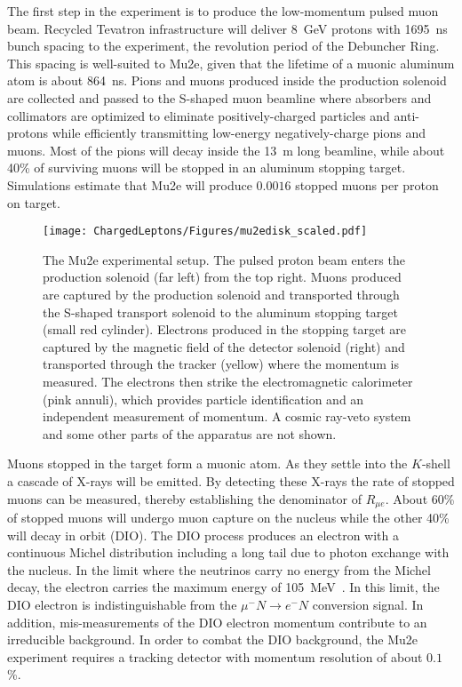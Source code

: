 The first step in the experiment is to produce the low-momentum pulsed
muon beam.  Recycled Tevatron infrastructure will deliver 8~GeV
protons with 1695~ns bunch spacing to the experiment, the
revolution period of the Debuncher Ring. This spacing is well-suited to Mu2e, given that the lifetime of a muonic aluminum atom is about
864~ns.  Pions and muons produced inside the production solenoid are
collected and passed to the S-shaped muon beamline where absorbers and
collimators are optimized to eliminate positively-charged particles
and anti-protons while efficiently transmitting low-energy
negatively-charge pions and muons.  Most of the pions will decay
inside the 13~m long beamline, while about 40\% of surviving muons
will be stopped in an aluminum stopping target.  Simulations estimate
that Mu2e will produce $0.0016$ stopped muons per proton on target.



\begin{figure}
\centering
\texttt{[image: ChargedLeptons/Figures/mu2edisk\_scaled.pdf]}
\caption{The Mu2e experimental setup. The pulsed proton beam enters
the production solenoid (far left) from the top right.  Muons
produced are captured by the production solenoid and transported
through the S-shaped transport solenoid to the aluminum stopping
target (small red cylinder).  Electrons produced in the stopping
target are captured by the magnetic field of the detector solenoid
(right) and transported through the tracker (yellow) where the
momentum is measured.  The electrons then strike the electromagnetic
calorimeter (pink annuli), which provides particle identification and an independent measurement of momentum.
A cosmic ray-veto system and some other parts of the apparatus are not
shown.
}
\label{cl:fig:mu2e}
\end{figure}



Muons stopped in the target form a muonic atom.  As they settle into
the $K$-shell a cascade of X-rays will be emitted.  By detecting these
X-rays the rate of stopped muons can be measured, thereby establishing
the denominator of $R_{\mu e}$. About 60\% of stopped muons will
undergo muon capture on the nucleus while the other 40\% will decay in
orbit (DIO).  The DIO process produces an electron with a continuous
Michel distribution including a long tail due to photon exchange with
the nucleus.  In the limit where the neutrinos carry no energy from
the Michel decay, the electron carries the maximum energy of 105~MeV~\cite{czarnecki}.
In this limit, the DIO electron is indistinguishable from the $\mu^-N
\rightarrow e^-N$ conversion signal.  In addition, mis-measurements of
the DIO electron momentum contribute to an irreducible background.
In order to combat the DIO background, the Mu2e experiment requires a
tracking detector with momentum resolution of about $0.1$\%.


